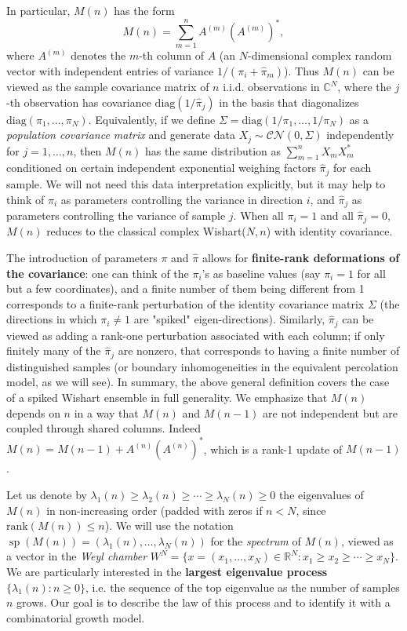\documentclass[letterpaper,11pt,oneside,reqno]{article}
\numberwithin{equation}{section}
\theoremstyle{definition}
\begin{document}
In particular, $M(n)$ has the form
\[ M(n) = \sum_{m=1}^n A^{(m)} (A^{(m)})^*, \]
where $A^{(m)}$ denotes the $m$-th column of $A$ (an $N$-dimensional complex random vector with independent entries of variance $1/(\pi_i+\hat\pi_m)$). Thus $M(n)$ can be viewed as the sample covariance matrix of $n$ i.i.d. observations in $\mathbb{C}^N$, where the $j$-th observation has covariance $\mathrm{diag}(1/\hat\pi_j)$ in the basis that diagonalizes $\mathrm{diag}(\pi_1,\dots,\pi_N)$. Equivalently, if we define $\Sigma = \mathrm{diag}(1/\pi_1,\dots,1/\pi_N)$ as a \emph{population covariance matrix} and generate data $X_j \sim \mathcal{CN}(0,\Sigma)$ independently for $j=1,\dots,n$, then $M(n)$ has the same distribution as $\sum_{m=1}^n X_m X_m^*$ conditioned on certain independent exponential weighing factors $\hat\pi_j$ for each sample. We will not need this data interpretation explicitly, but it may help to think of $\pi_i$ as parameters controlling the variance in direction $i$, and $\hat\pi_j$ as parameters controlling the variance of sample $j$. When all $\pi_i=1$ and all $\hat\pi_j=0$, $M(n)$ reduces to the classical complex Wishart($N,n$) with identity covariance.

The introduction of parameters $\pi$ and $\hat\pi$ allows for \textbf{finite-rank deformations of the covariance}: one can think of the $\pi_i$'s as baseline values (say $\pi_i=1$ for all but a few coordinates), and a finite number of them being different from 1 corresponds to a finite-rank perturbation of the identity covariance matrix $\Sigma$ (the directions in which $\pi_i\neq 1$ are "spiked" eigen-directions). Similarly, $\hat\pi_j$ can be viewed as adding a rank-one perturbation associated with each column; if only finitely many of the $\hat\pi_j$ are nonzero, that corresponds to having a finite number of distinguished samples (or boundary inhomogeneities in the equivalent percolation model, as we will see). In summary, the above general definition covers the case of a spiked Wishart ensemble in full generality. We emphasize that $M(n)$ depends on $n$ in a way that $M(n)$ and $M(n-1)$ are not independent but are coupled through shared columns. Indeed $M(n) = M(n-1) + A^{(n)}(A^{(n)})^*$, which is a rank-1 update of $M(n-1)$.

Let us denote by $\lambda_1(n)\ge \lambda_2(n)\ge \cdots \ge \lambda_N(n)\ge 0$ the eigenvalues of $M(n)$ in non-increasing order (padded with zeros if $n < N$, since $\mathrm{rank}(M(n)) \le n$). We will use the notation $\operatorname{sp}(M(n)) = (\lambda_1(n),\dots,\lambda_N(n))$ for the \emph{spectrum} of $M(n)$, viewed as a vector in the \emph{Weyl chamber} $W^N = \{x=(x_1,\dots,x_N)\in\mathbb{R}^N: x_1 \ge x_2 \ge \cdots \ge x_N\}$. We are particularly interested in the \textbf{largest eigenvalue process} $\{\lambda_1(n):n\ge0\}$, i.e. the sequence of the top eigenvalue as the number of samples $n$ grows. Our goal is to describe the law of this process and to identify it with a combinatorial growth model.
\end{document}
